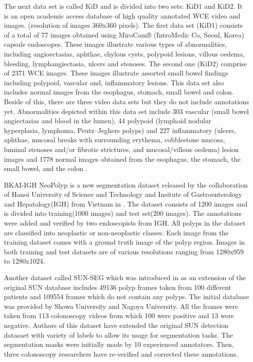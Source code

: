 \documentclass[preprint]{article}
\begin{document}
The next data set is called KiD and is divided into two sets: KiD1 and KiD2. It is an open academic access database of high quality annotated WCE video and images. (resolution of images 360x360 pixels). The first data set (KiD1) consists of a total of 77 images obtained using MiroCam® (IntroMedic Co, Seoul, Korea) capsule endoscopes. These images illustrate various types of abnormalities, including angioectasias, aphthae, chylous cysts, polypoid lesions, villous oedema, bleeding, lymphangiectasia, ulcers and stenoses. The second one (KiD2) comprise of 2371 WCE images. These images illustrate assorted small bowel findings including polypoid, vascular and, inflammatory lesions. This data set also includes normal images from the esophagus, stomach, small bowel and colon. Beside of this, there are three video data sets but they do not include annotations yet. Abnormalities depicted within this data set include 303 vascular (small bowel angiectasias and blood in the lumen), 44 polypoid (lymphoid nodular hyperplasia, lymphoma, Peutz–Jeghers polyps) and 227 inflammatory (ulcers, aphthae, mucosal breaks with surrounding erythema, cobblestone mucosa, luminal stenoses and/or fibrotic strictures, and mucosal/villous oedema) lesion images and 1778 normal images obtained from the esophagus, the stomach, the small bowel, and the colon \cite{kid}.

BKAI-IGH NeoPolyp is a new segmentation dataset released by the collaboration of Hanoi University of Science and Technology and Insitute of Gastroenterology and Hepatology(IGH) from Vietnam in \cite{NeoPolyp}. The dataset consists of 1200 images and is divided into training(1000 images) and test set(200 images). The annotations were added and verified by two endoscopists from IGH. All polyps in the dataset are classified into neoplastic or non-neoplastic classes. Each image from the training dataset comes with a ground truth image of the polyp region. Images in both training and test datasets are of various resolutions ranging from 1280x959 to 1280x1024.

Another dataset called SUN-SEG which was introduced in \cite{SUN-SEG} as an extension of the original SUN database includes 49136 polyp frames taken from 100 different patients and 109554 frames which do not contain any polyps. The initial database was provided by Showa University and Nagoya University. All the frames were taken from 113 colonoscopy videos from which 100 were positive and 13 were negative. Authors of this dataset have extended the original SUN detection datasaet with variety of labels to allow its usage for segmentation tasks. The segmentation masks were initially made by 10 experienced annotators. Then, three colonoscopy researchers have re-verified and corrected these annotations. 
\end{document}
